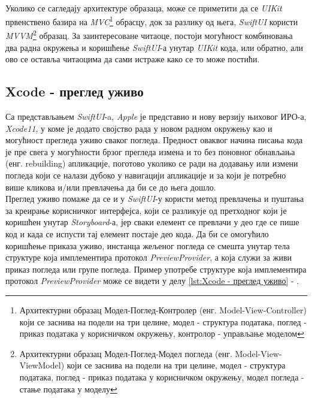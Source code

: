\documentclass[12pt,oneside]{memoir}
\begin{document}
\\
\indent Уколико се сагледају архитектуре образаца, може се приметити да се \textit{UIKit} првенствено базира на \textit{MVC}\footnote{Архитектурни образац Модел-Поглед-Контролер (енг. Model-View-Controller) који се заснива на подели на три целине, модел - структура података, поглед - приказ података у корисничком окружењу, контролор - управљање моделом} обрасцу, док за разлику од њега, \textit{SwiftUI} користи \textit{MVVM}\footnote{Архитектурни образац Модел-Поглед-Модел погледа (енг. Model-View-ViewModel) који се заснива на подели на три целине, модел - структура података, поглед - приказ података у корисничком окружењу, модел погледа - стање података у моделу} образац. За заинтересоване читаоце, постоји могућност комбиновања два радна окружења и коришћење \textit{SwiftUI}-а унутар \textit{UIKit} кода, или обратно, али ово се оставља читаоцима да сами истраже како се то може постићи.

\subsection{Xcode - преглед уживо}
\label{subsec:Xcode - преглед уживо}

\indent Са представљањем \textit{SwiftUI}-a, \textit{Apple} је представио и нову верзију њиховог ИРО-а, \textit{Xcode11}, у коме је додато својство рада у новом радном окружењу као и могућност прегледа уживо сваког погледа. Предност оваквог начина писања кода је пре свега у могућности брзог прегледа измена и то без поновног обнављања (енг. rebuilding) апликације, поготово уколико се ради на додавању или измени погледа који се налази дубоко у навигацији апликације и за који је потребно више кликова и/или превлачења да би се до њега дошло. 
\\
\indent Преглед уживо помаже да се и у \textit{SwiftUI}-у користи метод превлачења и пуштања за креирање корисничког интерфејса, који се разликује од претходног који је коришћен унутар \textit{Storyboard}-а, јер сваки елемент се превлачи у део где се пише код и када се испусти тај елемент постаје део кода. 
Да би се омогућило коришћење приказа уживо, инстанца жељеног погледа се смешта унутар тела структуре која имплементира протокол \textit{PreviewProvider}, а која служи за живи приказ погледа или групе погледа. Пример употребе структуре која имплементира протокол \textit{PreviewProvider} може се видети у делу \ref{lst:Xcode - преглед уживо} - .
\end{document}
